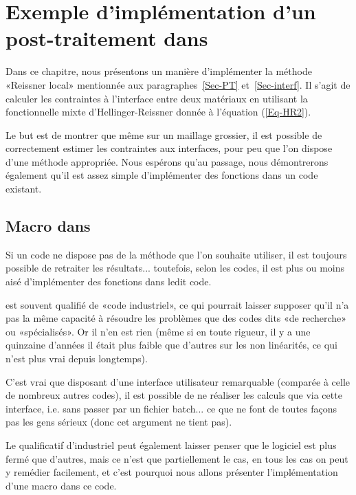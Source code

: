 \section{Exemple d'implémentation d'un post-traitement dans \ansys}

Dans ce chapitre, nous présentons un manière d'implémenter la méthode «Reissner local» mentionnée aux paragraphes~\ref{Sec-PT} et~\ref{Sec-interf}.
Il s'agit de calculer les contraintes à l'interface entre deux matériaux en utilisant la fonctionnelle mixte d'Hellinger-Reissner
donnée à l'équation (\ref{Eq-HR2}).

Le but est de montrer que même sur un maillage grossier, il est possible de correctement estimer les contraintes aux interfaces, pour peu que l'on dispose d'une méthode appropriée. Nous espérons qu'au passage, nous démontrerons également qu'il est assez simple d'implémenter des fonctions dans un code existant.


\medskip
\subsection{Macro dans \ansys}

Si un code ne dispose pas de la méthode que l'on souhaite utiliser, il est toujours possible de retraiter les résultats... toutefois, selon les codes, il est plus ou moins aisé d'implémenter des fonctions dans ledit code.

\medskip
\ansys est souvent qualifié de «code industriel», ce qui pourrait laisser supposer qu'il n'a pas la même capacité à résoudre les problèmes que des codes dits «de recherche» ou «spécialisés». Or il n'en est rien (même si en toute rigueur, il y a une quinzaine d'années il était plus faible que d'autres sur les non linéarités, ce qui n'est plus vrai depuis longtemps).

C'est vrai que disposant d'une interface utilisateur remarquable (comparée à celle de nombreux autres codes), il est possible de ne réaliser les calculs que via cette interface, i.e. sans passer par un fichier batch... ce que ne font de toutes façons pas les gens sérieux (donc cet argument ne tient pas).

Le qualificatif d'industriel peut également laisser penser que le logiciel est plus fermé que d'autres, mais ce n'est que partiellement le cas, en tous les cas on peut y remédier facilement, et c'est pourquoi nous allons présenter l'implémentation d'une macro dans ce code.

